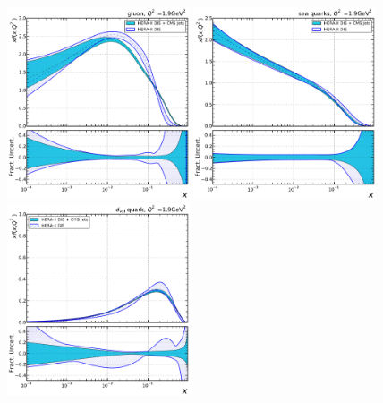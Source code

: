 %
%
\begin{figure}[tbp]
  \centering
  \includegraphics[width=0.48\textwidth]{figures/pdf_constraints/direct/HFTD_HERACMSTDJETS_V017_EIG_0_1_9.pdf}\hfill%
  \includegraphics[width=0.48\textwidth]{figures/pdf_constraints/direct/HFTD_HERACMSTDJETS_V017_EIG_9_1_9.pdf}
  \includegraphics[width=0.48\textwidth]{figures/pdf_constraints/direct/HFTD_HERACMSTDJETS_V017_EIG_7_1_9.pdf}\hfill%

\end{figure}
